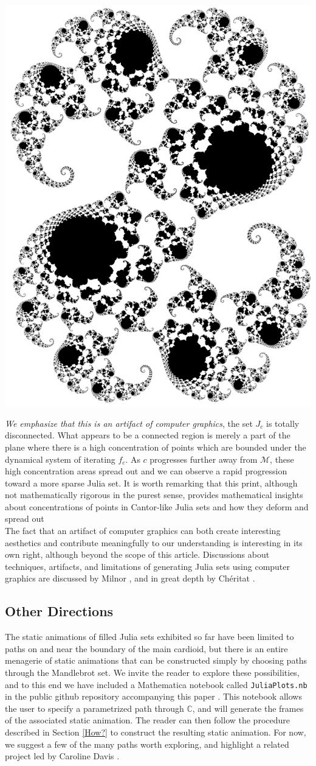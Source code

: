 \documentclass[12 pt]{article}
\newcommand{\bC}{\mathbb{C}}
\newcommand{\cM}{\mathcal{M}}
\begin{document}
\begin{center}
\includegraphics[width=.5\textwidth]{images/cantor_cropped.png}
\end{center}
\textit{We emphasize that this is an artifact of computer graphics}, the set $J_c$ is totally disconnected.  What appears to be a connected region is merely a part of the plane where there is a high concentration of points which are bounded under the dynamical system of iterating $f_c$.  As $c$ progresses further away from $\cM$, these high concentration areas spread out and we can observe a rapid progression toward a more sparse Julia set.  It is worth remarking that this print, although not mathematically rigorous in the purest sense, provides mathematical insights about concentrations of points in Cantor-like Julia sets and how they deform and spread out\\

The fact that an artifact of computer graphics can both create interesting aesthetics and contribute meaningfully to our understanding is interesting in its own right, although beyond the scope of this article.  Discussions about techniques, artifacts, and limitations of generating Julia sets using computer graphics are discussed by Milnor \cite[Appendix H]{Milnor}, and in great depth by Ch\'eritat \cite{Cheritat}.
\subsection{Other Directions}\label{juliaMore}
The static animations of filled Julia sets exhibited so far have been limited to paths on and near the boundary of the main cardioid,  but there is an entire menagerie of static animations that can be constructed simply by choosing paths through the Mandlebrot set.  We invite the reader to explore these possibilities, and to this end we have included a Mathematica notebook called \verb|JuliaPlots.nb| in the public github repository accompanying this paper \cite{github}.   This notebook allows the user to specify a parametrized path through $\bC$, and will generate the frames of the associated static animation.  The reader can then follow the procedure described in Section \ref{How?} to construct the resulting static animation. For now, we suggest a few of the many paths worth exploring, and highlight a related project led by Caroline Davis \cite{log(iu)}.
\end{document}
